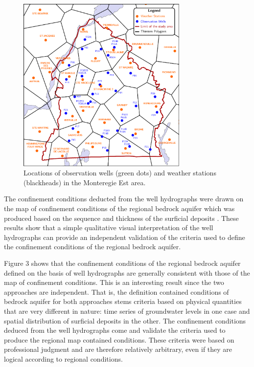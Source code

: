 \documentclass[WHATMANUAL.tex]{subfiles}
\begin{document}
\begin{figure}[!ht]
\centering
\includegraphics[width=0.75\textwidth]{img/Thiessen_meteo_wells}
\caption[Locations of observation wells (green dots) and weather stations (blackheads) in the Monteregie Est area.]{Locations of observation wells (green dots) and weather stations (blackheads) in the Monteregie Est area.}
\label{fig:Thiessen_meteo_wells}
\end{figure}

The confinement conditions deducted from the well hydrographs were drawn on the map of confinement conditions of the regional bedrock aquifer which was produced based on the sequence and thickness of the surficial deposits \citep{carrier_portrait_2013}. These results show that a simple qualitative visual interpretation of the well hydrographs can provide an independent validation of the criteria used to define the confinement conditions of the regional bedrock aquifer.

Figure 3 shows that the confinement conditions of the regional bedrock aquifer defined on the basis of well hydrographs are generally consistent with those of the map of confinement conditions. This is an interesting result since the two approaches are independent. That is, the definition contained conditions of bedrock aquifer for both approaches stems criteria based on physical quantities that are very different in nature: time series of groundwater levels in one case and spatial distribution of surficial deposits in the other. The confinement conditions deduced from the well hydrographs come and validate the criteria used to produce the regional map contained conditions. These criteria were based on professional judgment and are therefore relatively arbitrary, even if they are logical according to regional conditions.
\end{document}
